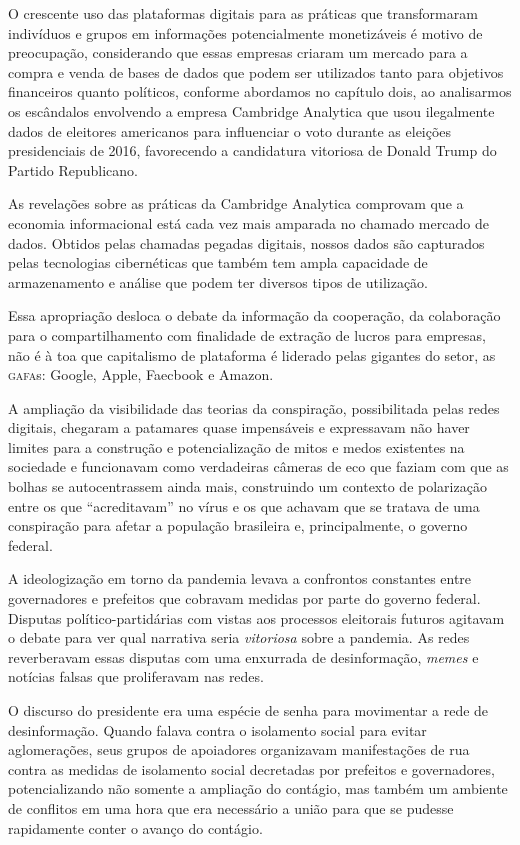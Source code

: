 O crescente uso das plataformas digitais para as práticas que
transformaram indivíduos e grupos em informações potencialmente
monetizáveis é motivo de preocupação, considerando que essas empresas
criaram um mercado para a compra e venda de bases de dados que podem ser
utilizados tanto para objetivos financeiros quanto políticos, conforme
abordamos no capítulo dois, ao analisarmos os escândalos envolvendo a
empresa Cambridge Analytica que usou ilegalmente dados de eleitores
americanos para influenciar o voto durante as eleições presidenciais de
2016, favorecendo a candidatura vitoriosa de Donald Trump do Partido
Republicano.

As revelações sobre as práticas da Cambridge Analytica comprovam que a
economia informacional está cada vez mais amparada no chamado mercado de
dados. Obtidos pelas chamadas pegadas digitais, nossos dados são
capturados pelas tecnologias cibernéticas que também tem ampla
capacidade de armazenamento e análise que podem ter diversos tipos de
utilização.

Essa apropriação desloca o debate da informação da cooperação, da
colaboração para o compartilhamento com finalidade de extração de lucros
para empresas, não é à toa que capitalismo de plataforma é liderado
pelas gigantes do setor, as \textsc{gafa}s: Google, Apple, Faecbook e Amazon.

A ampliação da visibilidade das teorias da conspiração, possibilitada
pelas redes digitais, chegaram a patamares quase impensáveis e
expressavam não haver limites para a construção e potencialização de
mitos e medos existentes na sociedade e funcionavam como verdadeiras
câmeras de eco que faziam com que as bolhas se autocentrassem ainda
mais, construindo um contexto de polarização entre os que
``acreditavam'' no vírus e os que achavam que se tratava de uma
conspiração para afetar a população brasileira e, principalmente, o
governo federal.

A ideologização em torno da pandemia levava a confrontos constantes
entre governadores e prefeitos que cobravam medidas por parte do governo
federal. Disputas político-partidárias com vistas aos processos
eleitorais futuros agitavam o debate para ver qual narrativa seria
\textit{vitoriosa} sobre a pandemia. As redes reverberavam essas disputas com
uma enxurrada de desinformação, \textit{memes} e notícias falsas que proliferavam
nas redes.

O discurso do presidente era uma espécie de senha para movimentar a rede
de desinformação. Quando falava contra o isolamento social para evitar
aglomerações, seus grupos de apoiadores organizavam manifestações de rua
contra as medidas de isolamento social decretadas por prefeitos e
governadores, potencializando não somente a ampliação do contágio, mas
também um ambiente de conflitos em uma hora que era necessário a união
para que se pudesse rapidamente conter o avanço do contágio.

